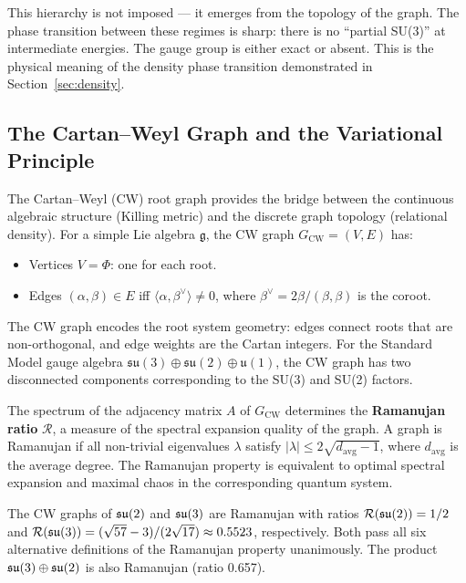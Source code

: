 This hierarchy is not imposed --- it emerges from the topology of the graph. The phase transition between these regimes is sharp: there is no ``partial SU(3)'' at intermediate energies. The gauge group is either exact or absent. This is the physical meaning of the density phase transition demonstrated in Section~\ref{sec:density}.

\subsection{The Cartan--Weyl Graph and the Variational Principle}\label{sec:cw_graph}

The Cartan--Weyl (CW) root graph provides the bridge between the continuous algebraic structure (Killing metric) and the discrete graph topology (relational density). For a simple Lie algebra $\mathfrak{g}$, the CW graph $G_{\mathrm{CW}} = (V, E)$ has:

\begin{itemize}
\item Vertices $V = \Phi$: one for each root.
\item Edges $(\alpha, \beta) \in E$ iff $\langle \alpha, \beta^\vee \rangle \neq 0$, where $\beta^\vee = 2\beta / (\beta, \beta)$ is the coroot.
\end{itemize}

The CW graph encodes the root system geometry: edges connect roots that are non-orthogonal, and edge weights are the Cartan integers. For the Standard Model gauge algebra $\mathfrak{su}(3) \oplus \mathfrak{su}(2) \oplus \mathfrak{u}(1)$, the CW graph has two disconnected components corresponding to the SU(3) and SU(2) factors.

The spectrum of the adjacency matrix $A$ of $G_{\mathrm{CW}}$ determines the \textbf{Ramanujan ratio} $\mathcal{R}$, a measure of the spectral expansion quality of the graph. A graph is Ramanujan if all non-trivial eigenvalues $\lambda$ satisfy $|\lambda| \leq 2\sqrt{d_{\mathrm{avg}} - 1}$, where $d_{\mathrm{avg}}$ is the average degree. The Ramanujan property is equivalent to optimal spectral expansion and maximal chaos in the corresponding quantum system.

\begin{theorem}
The CW graphs of $\mathfrak{su}(2)$ and $\mathfrak{su}(3)$ are Ramanujan with ratios $\mathcal{R}(\mathfrak{su}(2)) = 1/2$ and $\mathcal{R}(\mathfrak{su}(3)) = (\sqrt{57} - 3)/(2\sqrt{17}) \approx 0.5523$, respectively. Both pass all six alternative definitions of the Ramanujan property unanimously. The product $\mathfrak{su}(3) \oplus \mathfrak{su}(2)$ is also Ramanujan (ratio 0.657).
\end{theorem}


